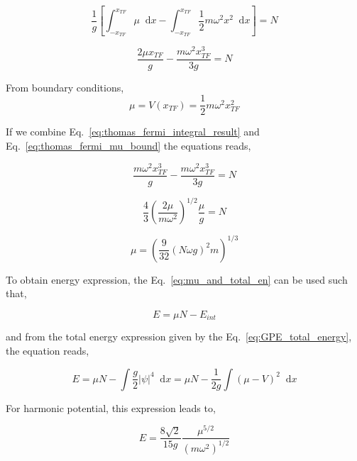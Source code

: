 \documentclass[a4paper,times,hidelinks,12pt]{article}
\newcommand*\dif{\mathop{}\!\mathrm{d}}
\begin{document}
\begin{equation}
   \frac{1}{g} \left [ \int_{-x_{TF}}^{x_{TF}} \mu \dif x - \int_{-x_{TF}}^{x_{TF}} \frac{1}{2}m\omega^2x^2 \dif x \right ] = N
\end{equation}

\begin{equation}
\label{eq:thomas_fermi_integral_result}
    \frac{2\mu x_{TF}}{g} - \frac{m\omega^2 x_{TF}^3}{3g} = N
\end{equation}


\noindent From boundary conditions,
\begin{equation}
\label{eq:thomas_fermi_mu_bound}
    \mu = V(x_{TF}) = \frac{1}{2}m\omega^2x_{TF}^2    
\end{equation}


\noindent If we combine Eq.~\eqref{eq:thomas_fermi_integral_result} and Eq.~\eqref{eq:thomas_fermi_mu_bound} the equations reads,

\begin{equation}
    \frac{m\omega^2 x_{TF}^3}{g} - \frac{m\omega^2 x_{TF}^3}{3g} = N
\end{equation}


\begin{equation}
    \frac{4}{3} \left( \frac{2\mu}{m\omega^2} \right)^{1/2} \frac{\mu}{g} = N
\end{equation}

\begin{equation}
    \mu = \left(\frac{9}{32} (N\omega g)^2 m \right)^{1/3}
\end{equation}

\noindent To obtain energy expression, the Eq.~\eqref{eq:mu_and_total_en} can be used such that,

\begin{equation}
\label{eq:thomas_fermi_energy_general}
E = \mu N - E_{int}
\end{equation}

\noindent and from the total energy expression given by the Eq.~\eqref{eq:GPE_total_energy}, the equation reads,

\begin{equation}
E = \mu N - \int \frac{g}{2}|\psi|^4 \dif x = \mu N - \frac{1}{2g}\int (\mu - V)^2 \dif x
\end{equation}

For harmonic potential, this expression leads to,

\begin{equation}
\label{eq:thomas_fermi_energy}
E = \frac{8\sqrt{2}}{15g}\frac{\mu^{5/2}}{(m\omega^2)^{1/2}}    
\end{equation}
\end{document}

